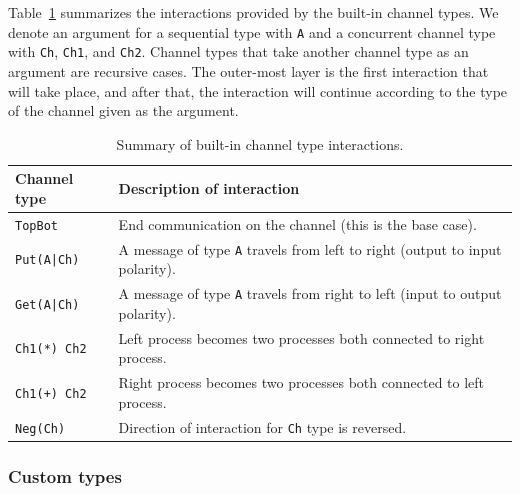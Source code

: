 \documentclass[11pt]{article}
\begin{document}
Table~\ref{Table:built_in_chs_summary} summarizes the interactions provided by the built-in channel types.
We denote an argument for a sequential type with \lstinline$A$ and a concurrent channel type with \lstinline$Ch$, \lstinline$Ch1$, and \lstinline$Ch2$.
Channel types that take another channel type as an argument are recursive cases. 
The outer-most layer is the first interaction that will take place, and after that, the interaction will continue according to the type of the channel given as the argument.
\begin{table}[!ht]
\begin{center}
\begin{tabular}{| l | l |}
	\hline
	 {\bf Channel type} & {\bf Description of interaction} \\
	 \hline
\lstinline$TopBot$ & End communication on the channel (this is the base case). \\
\lstinline$Put(A|Ch)$ & A message of type \lstinline$A$ travels from left to right (output to input polarity). \\ 
\lstinline$Get(A|Ch)$ & A message of type \lstinline$A$ travels from right to left (input to output polarity). \\
\lstinline$Ch1(*) Ch2$ & Left process becomes two processes both connected to right process. \\
\lstinline$Ch1(+) Ch2$ & Right process becomes two processes both connected to left process. \\
\lstinline$Neg(Ch)$ & Direction of interaction for \lstinline$Ch$ type is reversed. \\ 
		 \hline
\end{tabular}
	\caption{Summary of built-in channel type interactions.}
	\label{Table:built_in_chs_summary}
\end{center}
\end{table}


\subsubsection{Custom types}
\label{Sec:protocols}
\end{document}
